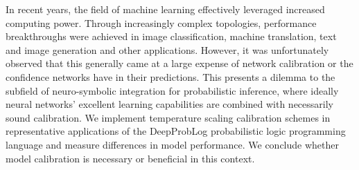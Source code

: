 In recent years, the field of machine learning effectively leveraged increased computing power. Through increasingly complex topologies, performance breakthroughs were achieved in image classification, machine translation, text and image generation and other applications. However, it was unfortunately observed that this generally came at a large expense of network calibration or the confidence networks have in their predictions. This presents a dilemma to the subfield of neuro-symbolic integration for probabilistic inference, where ideally neural networks' excellent learning capabilities are combined with necessarily sound calibration. We implement temperature scaling calibration schemes in representative applications of the DeepProbLog probabilistic logic programming language and measure differences in model performance. We conclude whether model calibration is necessary or beneficial in this context.